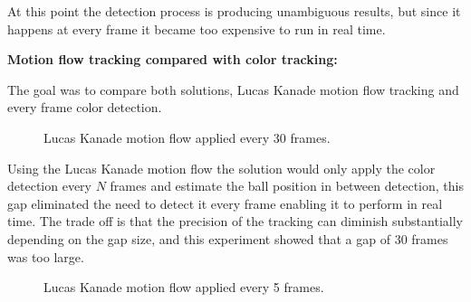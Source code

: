 \documentclass[10pt,twocolumn,letterpaper]{article}
\begin{document}
At this point the detection process is producing unambiguous results, but
since it happens at every frame it became too expensive to run in real time.

\bigbreak{}
\textbf{Motion flow tracking compared with color tracking:}
\bigbreak{}

The goal was to compare both solutions, Lucas Kanade motion flow tracking and
every frame color detection.

\begin{figure}[!h]
\centering
\setlength{\fboxsep}{1pt}
\setlength{\fboxrule}{1pt}
\caption{Lucas Kanade motion flow applied every 30 frames.}\label{fig:motion_30}
\end{figure}

Using the Lucas Kanade motion flow the solution would only apply the color
detection every $N$ frames and estimate the ball position in between
detection, this gap eliminated the need to detect it every frame enabling it
to perform in real time. The trade off is that the precision of the tracking
can diminish substantially depending on the gap size, and this experiment
showed that a gap of 30 frames was too large.

\begin{figure}[!h]
\centering
\setlength{\fboxsep}{1pt}
\setlength{\fboxrule}{1pt}
\caption{Lucas Kanade motion flow applied every 5 frames.}\label{fig:motion_5}
\end{figure}
\end{document}
